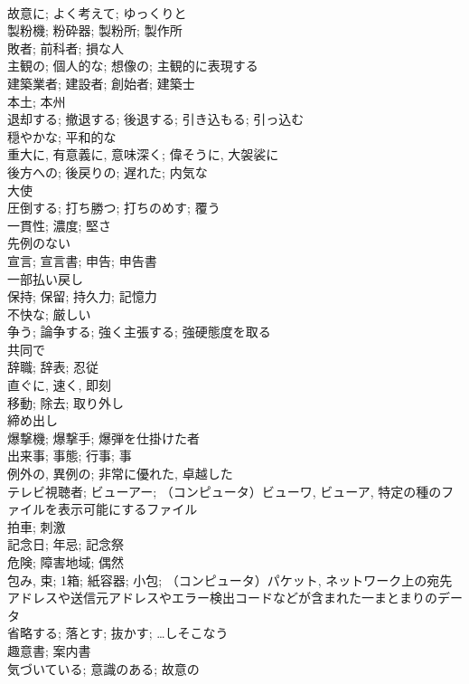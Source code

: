 \documentclass[8pt]{extreport}
\begin{document}
\begin{CJK}{UTF8}{min}
\\	故意に; よく考えて; ゆっくりと	
\\	製粉機; 粉砕器; 製粉所; 製作所	
\\	敗者; 前科者; 損な人	
\\	主観の; 個人的な; 想像の; 主観的に表現する	
\\	建築業者; 建設者; 創始者; 建築士	
\\	本土; 本州	
\\	退却する; 撤退する; 後退する; 引き込もる; 引っ込む	
\\	穏やかな; 平和的な	
\\	重大に, 有意義に, 意味深く; 偉そうに, 大袈裟に	
\\	後方への; 後戻りの; 遅れた; 内気な	
\\	大使	
\\	圧倒する; 打ち勝つ; 打ちのめす; 覆う	
\\	一貫性; 濃度; 堅さ	
\\	先例のない	
\\	宣言; 宣言書; 申告; 申告書	
\\	一部払い戻し	
\\	保持; 保留; 持久力; 記憶力	
\\	不快な; 厳しい	
\\	争う; 論争する; 強く主張する; 強硬態度を取る	
\\	共同で	
\\	辞職; 辞表; 忍従	
\\	直ぐに, 速く, 即刻	
\\	移動; 除去; 取り外し	
\\	締め出し	
\\	爆撃機; 爆撃手; 爆弾を仕掛けた者	
\\	出来事; 事態; 行事; 事	
\\	例外の, 異例の; 非常に優れた, 卓越した	
\\	テレビ視聴者; ビューアー; （コンピュータ）ビューワ, ビューア, 特定の種のファイルを表示可能にするファイル	
\\	拍車; 刺激	
\\	記念日; 年忌; 記念祭	
\\	危険; 障害地域; 偶然	
\\	包み, 束; 1箱; 紙容器; 小包; （コンピュータ）パケット, ネットワーク上の宛先アドレスや送信元アドレスやエラー検出コードなどが含まれた一まとまりのデータ	
\\	省略する; 落とす; 抜かす; …しそこなう	
\\	趣意書; 案内書	
\\	気づいている; 意識のある; 故意の	

\end{CJK}
\end{document}
